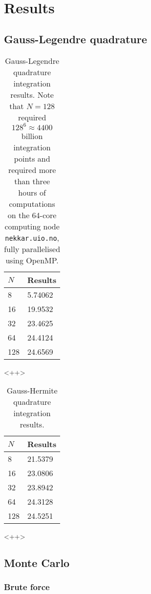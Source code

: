 \documentclass[a4paper,11pt]{article}
\begin{document}
\section{Results}
\subsection{Gauss-Legendre quadrature}

\begin{table}
    \centering
    \caption{Gauss-Legendre quadrature integration results. Note that $N=128$ required $128^6 \approx 4400$ billion integration points and required more than three hours of computations on the 64-core computing node \texttt{nekkar.uio.no}, fully parallelised using OpenMP.}
    \begin{tabular}{l l}
        \hline
        $N$ &   Results \\
        \hline
        8   &   5.74062 \\
        16  &   19.9532 \\
        32  &   23.4625 \\
        64  &   24.4124 \\
        128 &   24.6569 \\
        \hline
    \end{tabular}
    \label{tab:<+label+>}
\end{table}<++>

\begin{table}
    \centering
    \caption{Gauss-Hermite quadrature integration results.}
    \begin{tabular}{l l}
        \hline
        $N$ &   Results \\
        \hline
        8   &   21.5379 \\
        16  &   23.0806 \\
        32  &   23.8942 \\
        64  &   24.3128 \\
        128 &   24.5251 \\
        \hline
    \end{tabular}
    \label{tab:<+label+>}
\end{table}<++>

\subsection{Monte Carlo}

\subsubsection{Brute force}
\end{document}
